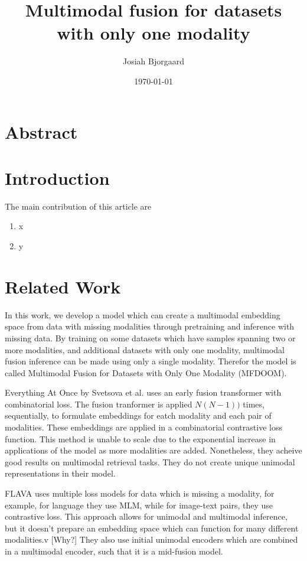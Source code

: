 \documentclass{article} %
\title{Multimodal fusion for datasets with only one modality} %
\author[1]{Josiah Bjorgaard} %
\affil[1]{Syntensor, Inc.}
\date{\today} %
\begin{document}
    \maketitle %
    
  \section{Abstract} %
    
  \section{Introduction}


The main contribution of this article are 
\begin{enumerate}
\setlength{\itemsep}{0pt}
\item x
\item y
\end{enumerate}


  \section{Related Work}
In this work, we develop a model which can create a multimodal embedding space from data with missing modalities through pretraining and inference with missing data. By training on some datasets which have samples spanning two or more modalities, and additional datasets with only one modality, multimodal fusion inference can be made using only a single modality. Therefor the model is called Multimodal Fusion for Datasets with Only One Modality (MFDOOM).

Everything At Once by Svetsova et al. uses an early fusion transformer with combinatorial loss. The fusion tranformer is applied $N(N-1))$ times, sequentially, to formulate embeddings for eatch modality and each pair of modalities. These embeddings are applied in a combinatorial contrastive loss function. This method is unable to scale due to the exponential increase in applications of the model as more modalities are added. Nonetheless, they acheive good results on multimodal retrieval tasks. They do not create unique unimodal representations in their model.

FLAVA uses multiple loss models for data which is missing a modality, for example, for language they use MLM, while for image-text pairs, they use contrastive loss. This approach allows for unimodal and multimodal inference, but it doesn't prepare an embedding space which can function for many different modalities.v [Why?] They also use initial unimodal encoders which are combined in a multimodal encoder, such that it is a mid-fusion model.
\end{document}
